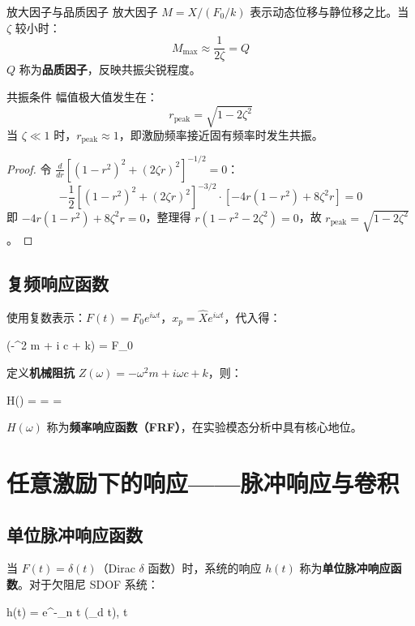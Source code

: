 \begin{mydefinition}{放大因子与品质因子}
	放大因子 $M = X / (F_0/k)$ 表示动态位移与静位移之比。当 $\zeta$ 较小时：
	\[
	M_{\max} \approx \frac{1}{2\zeta} = Q
	\]
	$Q$ 称为\textbf{品质因子}，反映共振尖锐程度。
\end{mydefinition}

\begin{theorem}{共振条件}
	幅值极大值发生在：
	\[
	r_{\text{peak}} = \sqrt{1 - 2\zeta^2}
	\]
	当 $\zeta \ll 1$ 时，$r_{\text{peak}} \approx 1$，即激励频率接近固有频率时发生共振。
\end{theorem}

\begin{proof}
	令 $\frac{d}{dr} [(1 - r^2)^2 + (2\zeta r)^2]^{-1/2} = 0$：
	\[
	-\frac{1}{2}[(1 - r^2)^2 + (2\zeta r)^2]^{-3/2} \cdot [-4r(1 - r^2) + 8\zeta^2 r] = 0
	\]
	即 $-4r(1 - r^2) + 8\zeta^2 r = 0$，整理得 $r(1 - r^2 - 2\zeta^2) = 0$，故 $r_{\text{peak}} = \sqrt{1 - 2\zeta^2}$。
\end{proof}

\subsection{复频响应函数}

使用复数表示：$F(t) = F_0 e^{i\omega t}$，$x_p = \hat{X} e^{i\omega t}$，代入得：
\begin{myformula}
	(-\omega^2 m + i \omega c + k)  = F_0
\end{myformula}
定义\textbf{机械阻抗} $Z(\omega) = -\omega^2 m + i\omega c + k$，则：
\begin{myformula}
	H(\omega) =  =  = 
\end{myformula}
$H(\omega)$ 称为\textbf{频率响应函数（FRF）}，在实验模态分析中具有核心地位。

\section{任意激励下的响应——脉冲响应与卷积}

\subsection{单位脉冲响应函数}

当 $F(t) = \delta(t)$（Dirac $\delta$ 函数）时，系统的响应 $h(t)$ 称为\textbf{单位脉冲响应函数}。对于欠阻尼 SDOF 系统：
\begin{myformula}
	h(t) =  e^{-\zeta \omega_n t} \sin(\omega_d t), \quad t 
\end{myformula}

